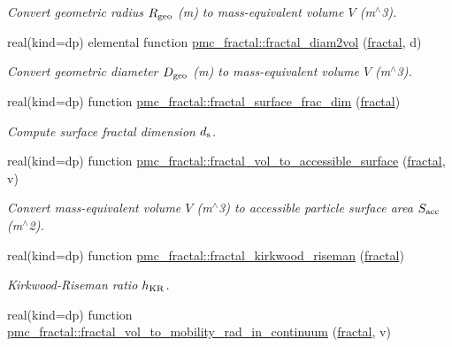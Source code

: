 \begin{DoxyCompactItemize}
\begin{DoxyCompactList}\small\item\em Convert geometric radius $R_{\rm geo}$ (m) to mass-\/equivalent volume $V$ (m$^\wedge$3). \end{DoxyCompactList}\item 
real(kind=dp) elemental function \mbox{\hyperlink{namespacepmc__fractal_a13aa17ef43c83973948ac8b325c0997b}{pmc\+\_\+fractal\+::fractal\+\_\+diam2vol}} (\mbox{\hyperlink{fractal_8_f90_a949ba7f6f3ce672ed686152acedb28bf}{fractal}}, d)
\begin{DoxyCompactList}\small\item\em Convert geometric diameter $D_{\rm geo}$ (m) to mass-\/equivalent volume $V$ (m$^\wedge$3). \end{DoxyCompactList}\item 
real(kind=dp) function \mbox{\hyperlink{namespacepmc__fractal_a66e1a24bcccb137795eed54c89d39254}{pmc\+\_\+fractal\+::fractal\+\_\+surface\+\_\+frac\+\_\+dim}} (\mbox{\hyperlink{fractal_8_f90_a949ba7f6f3ce672ed686152acedb28bf}{fractal}})
\begin{DoxyCompactList}\small\item\em Compute surface fractal dimension $d_{\rm s}$. \end{DoxyCompactList}\item 
real(kind=dp) function \mbox{\hyperlink{namespacepmc__fractal_a93eab681116d46a9ed91306e99f00840}{pmc\+\_\+fractal\+::fractal\+\_\+vol\+\_\+to\+\_\+accessible\+\_\+surface}} (\mbox{\hyperlink{fractal_8_f90_a949ba7f6f3ce672ed686152acedb28bf}{fractal}}, v)
\begin{DoxyCompactList}\small\item\em Convert mass-\/equivalent volume $V$ (m$^\wedge$3) to accessible particle surface area $S_{\rm acc}$ (m$^\wedge$2). \end{DoxyCompactList}\item 
real(kind=dp) function \mbox{\hyperlink{namespacepmc__fractal_a0124f3a93e7460e0f6889c214040ed54}{pmc\+\_\+fractal\+::fractal\+\_\+kirkwood\+\_\+riseman}} (\mbox{\hyperlink{fractal_8_f90_a949ba7f6f3ce672ed686152acedb28bf}{fractal}})
\begin{DoxyCompactList}\small\item\em Kirkwood-\/\+Riseman ratio $h_{\rm KR}$. \end{DoxyCompactList}\item 
real(kind=dp) function \mbox{\hyperlink{namespacepmc__fractal_a733d4d05da2a7640c7d9af5ed2bda824}{pmc\+\_\+fractal\+::fractal\+\_\+vol\+\_\+to\+\_\+mobility\+\_\+rad\+\_\+in\+\_\+continuum}} (\mbox{\hyperlink{fractal_8_f90_a949ba7f6f3ce672ed686152acedb28bf}{fractal}}, v)

\end{DoxyCompactItemize}
